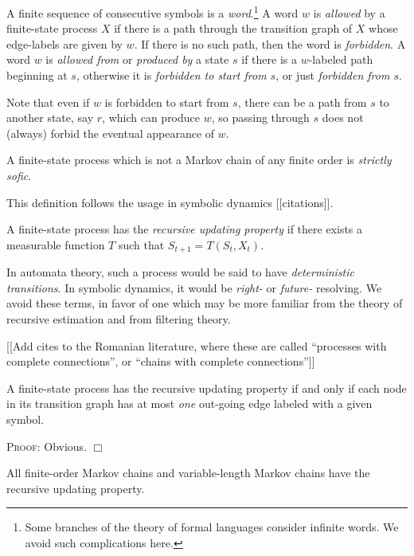\documentclass[../new-procedure.tex]{subfiles}
\begin{document}
\begin{definition}
  A finite sequence of consecutive symbols is a {\em word}.\footnote{Some
    branches of the theory of formal languages consider infinite words.  We
    avoid such complications here.}  A word $w$ is {\em allowed} by a
  finite-state process $X$ if there is a path through the transition graph of
  $X$ whose edge-labels are given by $w$.  If there is no such path, then the
  word is {\em forbidden}.  A word $w$ is {\em allowed from} or {\em produced
    by} a state $s$ if there is a $w$-labeled path beginning at $s$, otherwise
  it is {\em forbidden to start from $s$}, or just {\em forbidden from $s$}.
\end{definition}
Note that even if $w$ is forbidden to start from $s$, there can be a path from
$s$ to another state, say $r$, which can produce $w$, so passing through $s$
does not (always) forbid the eventual appearance of $w$.

\begin{definition}
A finite-state process which is not a Markov chain of any finite order is
{\em strictly sofic}.
\end{definition}
This definition follows the usage in symbolic dynamics [[citations]].

\begin{definition}
  A finite-state process has the {\em recursive updating property} if there
  exists a measurable function $T$ such that $S_{t+1} = T(S_t, X_t)$.
\end{definition}

In automata theory, such a process would be said to have {\em deterministic
  transitions}.  In symbolic dynamics, it would be {\em right-} or {\em
  future-} resolving.  We avoid these terms, in favor of one which may be more
familiar from the theory of recursive estimation and from filtering theory.

[[Add cites to the Romanian literature, where these are called ``processes with
complete connections'', or ``chains with complete connections'']]

\begin{proposition}
  A finite-state process has the recursive updating property if and only if
  each node in its transition graph has at most {\em one} out-going edge
  labeled with a given symbol.
\end{proposition}

\textsc{Proof:} Obvious. $\Box$

All finite-order Markov chains and variable-length Markov chains have the
recursive updating property.
\end{document}
